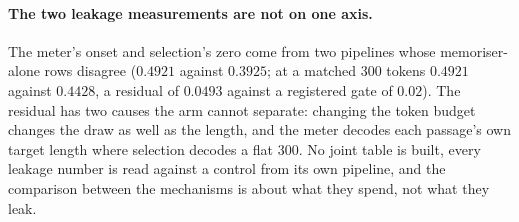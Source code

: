 \paragraph{The two leakage measurements are not on one axis.}
The meter's onset and selection's zero come from two pipelines whose memoriser-alone rows disagree ($0.4921$
against $0.3925$; at a matched $300$ tokens $0.4921$ against $0.4428$, a residual of $0.0493$ against a
registered gate of $0.02$). The residual has two causes the arm cannot separate: changing the token budget changes the draw as well as the length, and the meter decodes each passage's own target length where selection decodes a flat $300$. No joint table is built, every leakage number is read against a control from
its own pipeline, and the comparison between the mechanisms is about what they spend, not what they leak.
